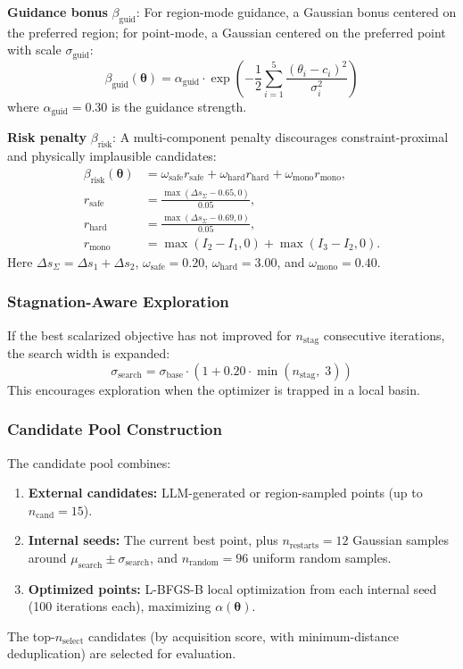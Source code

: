 \documentclass[journal]{IEEEtran}
\newcommand{\btheta}{\boldsymbol{\theta}}
\begin{document}
\textbf{Guidance bonus} $\beta_{\text{guid}}$: For region-mode guidance, a Gaussian bonus centered on the preferred region; for point-mode, a Gaussian centered on the preferred point with scale $\sigma_{\text{guid}}$:
\begin{equation}
\beta_{\text{guid}}(\btheta) = \alpha_{\text{guid}} \cdot \exp\!\left(-\frac{1}{2}\sum_{i=1}^{5} \frac{(\theta_i - c_i)^2}{\sigma_i^2}\right)
\label{eq:guid_bonus}
\end{equation}
where $\alpha_{\text{guid}} = 0.30$ is the guidance strength.

\textbf{Risk penalty} $\beta_{\text{risk}}$: A multi-component penalty discourages constraint-proximal and physically implausible candidates:
\begin{align}
\beta_{\text{risk}}(\btheta)
&= \omega_{\text{safe}} r_{\text{safe}}
+\omega_{\text{hard}} r_{\text{hard}}
+\omega_{\text{mono}} r_{\text{mono}},
\label{eq:risk_penalty}\\
r_{\text{safe}} &= \frac{\max(\Delta s_{\Sigma}-0.65,0)}{0.05}, \nonumber\\
r_{\text{hard}} &= \frac{\max(\Delta s_{\Sigma}-0.69,0)}{0.05}, \nonumber\\
r_{\text{mono}} &= \max(I_2-I_1,0)+\max(I_3-I_2,0). \nonumber
\end{align}
Here $\Delta s_{\Sigma} = \Delta s_1+\Delta s_2$, $\omega_{\text{safe}} = 0.20$, $\omega_{\text{hard}} = 3.00$, and $\omega_{\text{mono}} = 0.40$.

\subsubsection{Stagnation-Aware Exploration}

If the best scalarized objective has not improved for $n_{\text{stag}}$ consecutive iterations, the search width is expanded:
\begin{equation}
\sigma_{\text{search}} = \sigma_{\text{base}} \cdot (1 + 0.20 \cdot \min(n_{\text{stag}},\; 3))
\label{eq:stag}
\end{equation}
This encourages exploration when the optimizer is trapped in a local basin.

\subsubsection{Candidate Pool Construction}

The candidate pool combines:
\begin{enumerate}
\item \textbf{External candidates:} LLM-generated or region-sampled points (up to $n_{\text{cand}} = 15$).
\item \textbf{Internal seeds:} The current best point, plus $n_{\text{restarts}} = 12$ Gaussian samples around $\mu_{\text{search}} \pm \sigma_{\text{search}}$, and $n_{\text{random}} = 96$ uniform random samples.
\item \textbf{Optimized points:} L-BFGS-B local optimization from each internal seed (100 iterations each), maximizing $\alpha(\btheta)$.
\end{enumerate}
The top-$n_{\text{select}}$ candidates (by acquisition score, with minimum-distance deduplication) are selected for evaluation.
\end{document}
